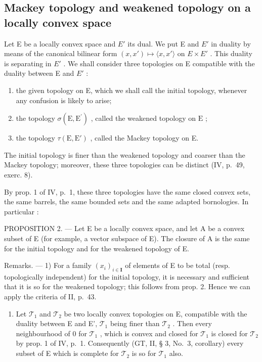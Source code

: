 \subsection{Mackey topology and weakened topology on a locally convex space}

Let E be a locally convex space and \(E'\) its dual. We put E and \(E'\) in duality by means of the canonical bilinear form \((x, x') \mapsto \langle x, x' \rangle\) on \(E \times E'\) . This duality is separating in \(E'\) . We shall consider three topologies on E compatible with the duality between E and \(E'\) :

\begin{enumerate}
\def\labelenumi{\alph{enumi})}
\item
  the given topology on E, which we shall call the initial topology, whenever any confusion is likely to arise;
\item
  the topology \(\sigma(\mathrm{E},\mathrm{E}^{\prime})\) , called the weakened topology on \(\mathrm{E}\) ;
\item
  the topology \(\tau(\mathrm{E},\mathrm{E}')\) , called the Mackey topology on E.
\end{enumerate}

The initial topology is finer than the weakened topology and coarser than the Mackey topology; moreover, these three topologies can be distinct (IV, p.~49, exerc. 8).

By prop. 1 of IV, p.~1, these three topologies have the same closed convex sets, the same barrels, the same bounded sets and the same adapted bornologies. In particular :

PROPOSITION 2. --- Let E be a locally convex space, and let A be a convex subset of E (for example, a vector subspace of E). The closure of A is the same for the initial topology and for the weakened topology of E.

Remarks. --- 1) For a family \((x_{i})_{i\in\mathbf{I}}\) of elements of E to be total (resp. topologically independent) for the initial topology, it is necessary and sufficient that it is so for the weakened topology; this follows from prop. 2. Hence we can apply the criteria of II, p.~43.

\begin{enumerate}
\def\labelenumi{\arabic{enumi})}
\setcounter{enumi}{1}
\tightlist
\item
  Let \(\mathcal{T}_1\) and \(\mathcal{T}_2\) be two locally convex topologies on E, compatible with the duality between E and E', \(\mathcal{T}_1\) being finer than \(\mathcal{T}_2\) . Then every neighbourhood of 0 for \(\mathcal{T}_1\) , which is convex and closed for \(\mathcal{T}_1\) is closed for \(\mathcal{T}_2\) by prop. 1 of IV, p.~1. Consequently (GT, II, § 3, No.~3, corollary) every subset of E which is complete for \(\mathcal{T}_2\) is so for \(\mathcal{T}_1\) also.
\end{enumerate}

